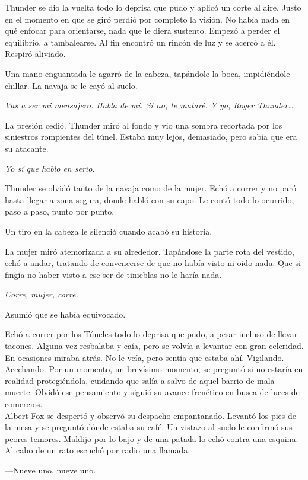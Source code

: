 Thunder se dio la vuelta todo lo deprisa que pudo y aplicó un corte al aire. Justo en el momento en que se giró perdió por completo la visión. No había nada en qué enfocar para orientarse, nada que le diera sustento. Empezó a perder el equilibrio, a tambalearse. Al fin encontró un rincón de luz y se acercó a él. Respiró aliviado.

Una mano enguantada le agarró de la cabeza, tapándole la boca, impidiéndole chillar. La navaja se le cayó al suelo.

\emph{Vas a ser mi mensajero. Habla de mí. Si no, te mataré. Y yo, Roger Thunder\dots}

La presión cedió. Thunder miró al fondo y vio una sombra recortada por los siniestros rompientes del túnel. Estaba muy lejos, demasiado, pero sabía que era su atacante.

\emph{Yo sí que hablo en serio.}

Thunder se olvidó tanto de la navaja como de la mujer. Echó a correr y no paró hasta llegar a zona segura, donde habló con su capo. Le contó todo lo ocurrido, paso a paso, punto por punto.

Un tiro en la cabeza le silenció cuando acabó su historia.

La mujer miró atemorizada a su alrededor. Tapándose la parte rota del vestido, echó a andar, tratando de convencerse de que no había visto ni oído nada. Que si fingía no haber visto a ese ser de tinieblas no le haría nada.

\emph{Corre, mujer, corre.}

Asumió que se había equivocado.

Echó a correr por los Túneles todo lo deprisa que pudo, a pesar incluso de llevar tacones. Alguna vez resbalaba y caía, pero se volvía a levantar con gran celeridad. En ocasiones miraba atrás. No le veía, pero sentía que estaba ahí. Vigilando. Acechando. Por un momento, un brevísimo momento, se preguntó si no estaría en realidad protegiéndola, cuidando que salía a salvo de aquel barrio de mala muerte. Olvidó ese pensamiento y siguió su avance frenético en busca de luces de comercios.\\

\noindent{}Albert Fox se despertó y observó su despacho empantanado. Levantó los pies de la mesa y se preguntó dónde estaba su café. Un vistazo al suelo le confirmó sus peores temores. Maldijo por lo bajo y de una patada lo echó contra una esquina. Al cabo de un rato escuchó por radio una llamada.

---Nueve uno, nueve uno.

